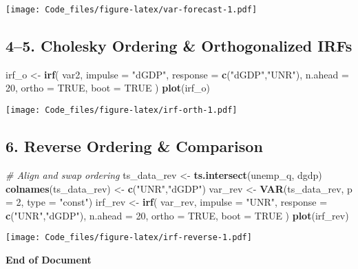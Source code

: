 \documentclass[
]{article}
\newenvironment{Shaded}{\begin{snugshade}}{\end{snugshade}}
\newcommand{\AttributeTok}[1]{\textcolor[rgb]{0.13,0.29,0.53}{#1}}
\newcommand{\CommentTok}[1]{\textcolor[rgb]{0.56,0.35,0.01}{\textit{#1}}}
\newcommand{\ConstantTok}[1]{\textcolor[rgb]{0.56,0.35,0.01}{#1}}
\newcommand{\DecValTok}[1]{\textcolor[rgb]{0.00,0.00,0.81}{#1}}
\newcommand{\FunctionTok}[1]{\textcolor[rgb]{0.13,0.29,0.53}{\textbf{#1}}}
\newcommand{\NormalTok}[1]{#1}
\newcommand{\OtherTok}[1]{\textcolor[rgb]{0.56,0.35,0.01}{#1}}
\newcommand{\StringTok}[1]{\textcolor[rgb]{0.31,0.60,0.02}{#1}}
\begin{document}
\texttt{[image: Code\_files/figure-latex/var-forecast-1.pdf]}

\hypertarget{cholesky-ordering-orthogonalized-irfs}{%
\subsection{4--5. Cholesky Ordering \& Orthogonalized
IRFs}\label{cholesky-ordering-orthogonalized-irfs}}

\begin{Shaded}
\begin{Highlighting}[]
\NormalTok{irf\_o }\OtherTok{\textless{}{-}} \FunctionTok{irf}\NormalTok{(}
\NormalTok{  var2,}
  \AttributeTok{impulse  =} \StringTok{"dGDP"}\NormalTok{,}
  \AttributeTok{response =} \FunctionTok{c}\NormalTok{(}\StringTok{"dGDP"}\NormalTok{,}\StringTok{"UNR"}\NormalTok{),}
  \AttributeTok{n.ahead  =} \DecValTok{20}\NormalTok{,}
  \AttributeTok{ortho    =} \ConstantTok{TRUE}\NormalTok{,}
  \AttributeTok{boot     =} \ConstantTok{TRUE}
\NormalTok{)}
\FunctionTok{plot}\NormalTok{(irf\_o)}
\end{Highlighting}
\end{Shaded}

\texttt{[image: Code\_files/figure-latex/irf-orth-1.pdf]}

\hypertarget{reverse-ordering-comparison}{%
\subsection{6. Reverse Ordering \&
Comparison}\label{reverse-ordering-comparison}}

\begin{Shaded}
\begin{Highlighting}[]
\CommentTok{\# Align and swap ordering}
\NormalTok{ts\_data\_rev }\OtherTok{\textless{}{-}} \FunctionTok{ts.intersect}\NormalTok{(unemp\_q, dgdp)}
\FunctionTok{colnames}\NormalTok{(ts\_data\_rev) }\OtherTok{\textless{}{-}} \FunctionTok{c}\NormalTok{(}\StringTok{"UNR"}\NormalTok{,}\StringTok{"dGDP"}\NormalTok{)}
\NormalTok{var\_rev }\OtherTok{\textless{}{-}} \FunctionTok{VAR}\NormalTok{(ts\_data\_rev, }\AttributeTok{p =} \DecValTok{2}\NormalTok{, }\AttributeTok{type =} \StringTok{"const"}\NormalTok{)}
\NormalTok{irf\_rev }\OtherTok{\textless{}{-}} \FunctionTok{irf}\NormalTok{(}
\NormalTok{  var\_rev,}
  \AttributeTok{impulse  =} \StringTok{"UNR"}\NormalTok{,}
  \AttributeTok{response =} \FunctionTok{c}\NormalTok{(}\StringTok{"UNR"}\NormalTok{,}\StringTok{"dGDP"}\NormalTok{),}
  \AttributeTok{n.ahead  =} \DecValTok{20}\NormalTok{,}
  \AttributeTok{ortho    =} \ConstantTok{TRUE}\NormalTok{,}
  \AttributeTok{boot     =} \ConstantTok{TRUE}
\NormalTok{)}
\FunctionTok{plot}\NormalTok{(irf\_rev)}
\end{Highlighting}
\end{Shaded}

\texttt{[image: Code\_files/figure-latex/irf-reverse-1.pdf]}

\textbf{End of Document}
\end{document}
